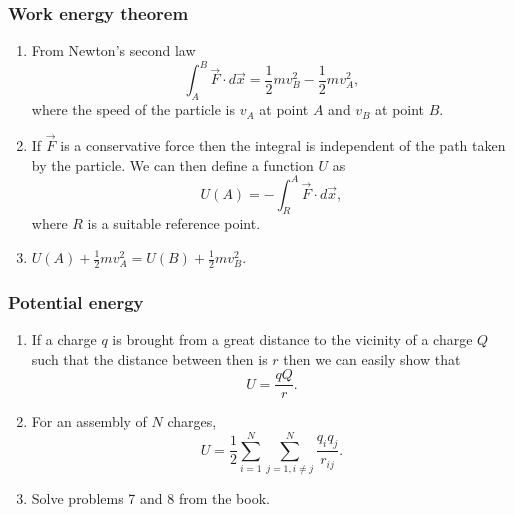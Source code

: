 \documentclass{beamer}
\begin{document}
\begin{frame}
\frametitle{Work energy theorem}
\begin{enumerate}
\item From Newton's second law 
\begin{equation}\label{e2}
\int_A^B \vec{F}\cdot d\vec{x} = \frac{1}{2}mv_B^2 - \frac{1}{2}mv_A^2,
\end{equation}
where the speed of the particle is $v_A$ at point $A$ and $v_B$ at point $B$. 

\item If $\vec{F}$ is a conservative force then the integral is independent of the path taken by the particle. We can then
define a function $U$ as
\begin{equation}\label{e3}
U(A) = -\int_R^A \vec{F}\cdot d\vec{x},
\end{equation}
where $R$ is a suitable reference point.

\item $U(A) + \frac{1}{2}mv_A^2 = U(B) + \frac{1}{2}mv_B^2$.
\end{enumerate}
\end{frame}

\begin{frame}
\frametitle{Potential energy}
\begin{enumerate}
\item If a charge $q$ is brought from a great distance to the vicinity of a charge $Q$ such that the distance between then
is $r$ then we can easily show that 
\begin{equation}\label{e4}
U = \frac{qQ}{r}.
\end{equation}
\item For an assembly of $N$ charges,
\begin{equation}\label{e5}
U = \frac{1}{2}\sum_{i=1}^N\sum_{j=1, i \ne j}^N \frac{q_iq_j}{r_{ij}}.
\end{equation}
\item Solve problems 7 and 8 from the book.
\end{enumerate}
\end{frame}
\end{document}
